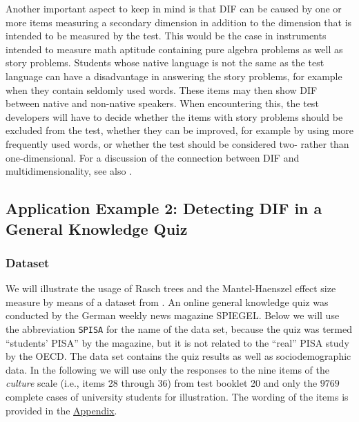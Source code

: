 \documentclass[doc,floatsintext,natbib]{apa7}
\begin{document}
Another important aspect to keep in mind is that DIF can be caused by one or more items measuring a secondary dimension in addition to the dimension that is intended to be measured by the test. This would be the case in instruments intended to measure math aptitude containing pure algebra problems as well as story problems. Students whose native language is not the same as the test language can have a disadvantage in answering the story problems, for example when they contain seldomly used words. These items may then show DIF between native and non-native speakers. When encountering this, the test developers will have to decide whether the items with story problems should be excluded from the test, whether they can be improved, for example by using more frequently used words, or whether the test should be considered two- rather than one-dimensional. For a discussion of the connection between DIF and multidimensionality, see also \cite{Ack:1992,Stretal:2021:APM}.



\subsection{Application Example 2: Detecting DIF in a General Knowledge Quiz}
\label{sec:TutorialRasch}


\subsubsection{Dataset}

We will illustrate the usage of Rasch trees and the Mantel-Haenszel effect size measure by means of a dataset from \citet{SPISA:book}. An online general knowledge quiz was conducted by the German
weekly news magazine SPIEGEL. Below we will use the abbreviation \texttt{SPISA} for the name of the data set, because the quiz was termed ``students' PISA'' by the magazine, but it is not related to the ``real'' PISA study by the OECD. The data set contains the quiz results as well as sociodemographic data. In the following we will use only the responses to the nine items of the \textit{culture} scale (i.e., items 28 through 36) from test booklet 20 and only the $9769$ complete cases of university students for illustration. The wording of the items is provided in the \hyperref[sec:AppendixA]{Appendix}.
\end{document}
